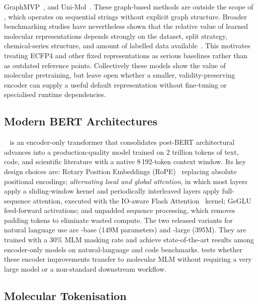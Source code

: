 \documentclass[11pt,a4paper]{article}
\begin{document}
GraphMVP~\citep{liuPretrainingMolecularGraph2022},
and Uni-Mol~\citep{zhouUniMolUniversal3D2023}.
These graph-based methods are outside the scope of \model{}, which
operates on sequential \selfies{} strings without explicit graph
structure. Broader benchmarking studies have nevertheless shown that the
relative value of learned molecular representations depends strongly on the
dataset, split strategy, chemical-series structure, and amount of labelled
data available~\citep{yangAnalyzingLearnedMolecular2019,dengSystematicStudyKey2023}.
This motivates treating ECFP4 and other fixed representations as serious
baselines rather than as outdated reference points.
Collectively these models show the value of molecular pretraining, but leave
open whether a smaller, validity-preserving encoder can supply a useful default
representation without fine-tuning or specialised runtime dependencies.

\subsection{Modern BERT Architectures}
\label{sec:rel-modernbert}

\modernbert{}~\citep{warnerSmarterBetterFaster2024} is an encoder-only
transformer that consolidates post-BERT architectural advances into a
production-quality model trained on 2 trillion tokens of text, code, and
scientific literature with a native 8\,192-token context window.
Its key design choices are: Rotary Position Embeddings
(RoPE)~\citep{suRoFormerEnhancedTransformer2023} replacing absolute positional
encodings; \emph{alternating local and global attention}, in which most layers
apply a sliding-window kernel and periodically interleaved layers apply
full-sequence attention, executed with the IO-aware Flash
Attention~\citep{daoFlashAttentionFastMemoryEfficient2022} kernel; GeGLU
feed-forward activations; and unpadded sequence processing, which removes
padding tokens to eliminate wasted compute.
The two released variants for natural language use are \modernbert{}-base (149M parameters) and
\modernbert{}-large (395M). They are trained with a 30\% MLM masking rate and
achieve state-of-the-art results among encoder-only models on natural-language
and code benchmarks.
\model{} tests whether these encoder improvements transfer to molecular
\selfies{} MLM without requiring a very large model or a non-standard
downstream workflow.

\subsection{Molecular Tokenisation}
\label{sec:rel-tokenisation}
\end{document}
